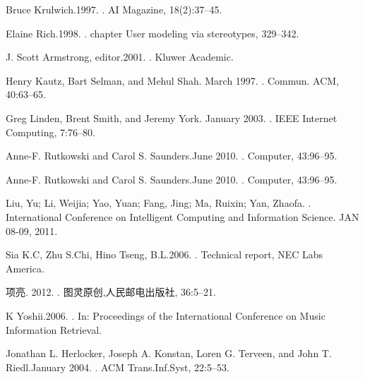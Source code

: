 \begin{thebibliography}{10}
Bruce Krulwich.1997.
.
\newblock AI Magazine, 18(2):37–45.

Elaine Rich.1998.
.
\newblock chapter User modeling via stereotypes, 329–342. 

J. Scott Armstrong, editor.2001.
.
\newblock Kluwer Academic.

Henry Kautz, Bart Selman, and Mehul Shah. March 1997.
.
\newblock Commun. ACM, 40:63–65.

Greg Linden, Brent Smith, and Jeremy York. January 2003.
.
\newblock IEEE Internet Computing, 7:76–80.

Anne-F. Rutkowski and Carol S. Saunders.June 2010.
.
\newblock Computer, 43:96–95.

Anne-F. Rutkowski and Carol S. Saunders.June 2010.
.
\newblock Computer, 43:96–95.

Liu, Yu; Li, Weijia; Yao, Yuan; Fang, Jing; Ma, Ruixin; Yan, Zhaofa.
.
\newblock International Conference on Intelligent Computing and Information Science. JAN 08-09, 2011.

Sia K.C, Zhu S.Chi, Hino Tseng, B.L.2006.
.
\newblock Technical report, NEC Labs America. 

项亮. 2012.
.
\newblock 图灵原创,人民邮电出版社, 36:5–21.

K Yoshii.2006.
.
\newblock In: Proceedings of the International Conference on Music Information Retrieval.

Jonathan L. Herlocker, Joseph A. Konstan, Loren G. Terveen, and John T. Riedl.January 2004.
.
\newblock ACM Trans.Inf.Syst, 22:5–53.


\end{thebibliography}
